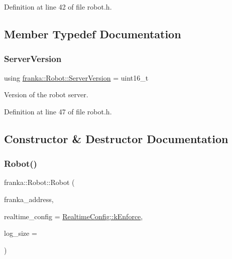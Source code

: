 Definition at line 42 of file robot.\+h.



\subsection{Member Typedef Documentation}
\mbox{\label{classfranka_1_1Robot_ad1dd3dccff6f33691d2c66eaa5ac5a10}} 
\subsubsection{\texorpdfstring{Server\+Version}{ServerVersion}}
{\footnotesize\ttfamily using \hyperlink{classfranka_1_1Robot_ad1dd3dccff6f33691d2c66eaa5ac5a10}{franka\+::\+Robot\+::\+Server\+Version} =  uint16\+\_\+t}

Version of the robot server. 

Definition at line 47 of file robot.\+h.



\subsection{Constructor \& Destructor Documentation}
\mbox{\label{classfranka_1_1Robot_ae63bc19390df3d54f3a270814df35eb6}} 
\subsubsection{\texorpdfstring{Robot()}{Robot()}\hspace{0.1cm}{\footnotesize\ttfamily [1/2]}}
{\footnotesize\ttfamily franka\+::\+Robot\+::\+Robot (\begin{DoxyParamCaption}\item[{const std\+::string \&}]{franka\+\_\+address,  }\item[{\hyperlink{namespacefranka_aeede4f4629390fea21ca5e5a35a8a943}{Realtime\+Config}}]{realtime\+\_\+config = {\ttfamily \hyperlink{namespacefranka_aeede4f4629390fea21ca5e5a35a8a943a024bd586d70db805d622b85815bfa0de}{Realtime\+Config\+::k\+Enforce}},  }\item[{size\+\_\+t}]{log\+\_\+size = {} }\end{DoxyParamCaption})\hspace{0.3cm}{\ttfamily [explicit]}}

